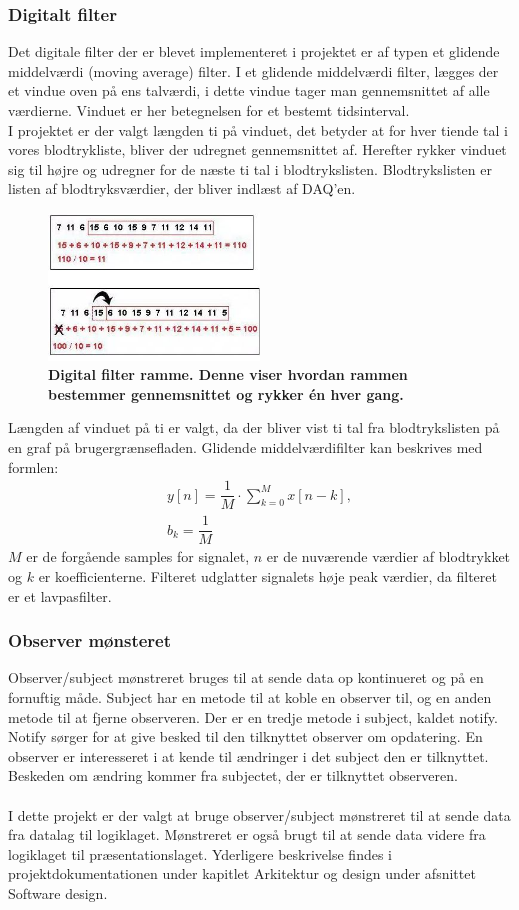 \subsubsection{Digitalt filter}
Det digitale filter der er blevet implementeret i projektet er af typen et glidende middelværdi (moving average) filter. I et glidende middelværdi filter, lægges der et vindue oven på ens talværdi, i dette vindue tager man gennemsnittet af alle værdierne. \cite{digifilter} Vinduet er her betegnelsen for et bestemt tidsinterval. \\
I projektet er der valgt længden ti på vinduet, det betyder at for hver tiende tal i vores blodtrykliste, bliver der udregnet gennemsnittet af. Herefter rykker vinduet sig til højre og udregner for de næste ti tal i blodtrykslisten. Blodtrykslisten er listen af blodtryksværdier, der bliver indlæst af DAQ’en. 
\begin{figure}[H]
\includegraphics[width =0.5\textwidth , center]{billeder/RammeDigi}
\caption{\textbf{Digital filter ramme. Denne viser hvordan rammen bestemmer gennemsnittet og rykker én hver gang.}}
\end{figure}
Længden af vinduet på ti er valgt, da der bliver vist ti tal fra blodtrykslisten på en graf på brugergrænsefladen. 
Glidende middelværdifilter kan beskrives med formlen:
\begin{align}
y\left[n\right] = \dfrac{1}{M}\cdot \sum_{k=0}^{M}x\left[n-k\right],\\ b_{k}=\dfrac{1}{M}
\end{align}
$M$ er de forgående samples for signalet, $n$ er de nuværende værdier af blodtrykket og $k$ er koefficienterne. 
Filteret udglatter signalets høje peak værdier, da filteret er et lavpasfilter.
\subsubsection{Observer mønsteret}
Observer/subject mønstreret bruges til at sende data op kontinueret og på en fornuftig måde. Subject har en metode til at koble en observer til, og en anden metode til at fjerne observeren. Der er en tredje metode i subject, kaldet notify. Notify sørger for at give besked til den tilknyttet observer om opdatering. En observer er interesseret i at kende til ændringer i det subject den er tilknyttet. Beskeden om ændring kommer fra subjectet, der er tilknyttet observeren. \\
\\
I dette projekt er der valgt at bruge observer/subject mønstreret til at sende data fra datalag til logiklaget. Mønstreret er også brugt til at sende data videre fra logiklaget til præsentationslaget. Yderligere beskrivelse findes i projektdokumentationen under kapitlet Arkitektur og design under afsnittet Software design. 
